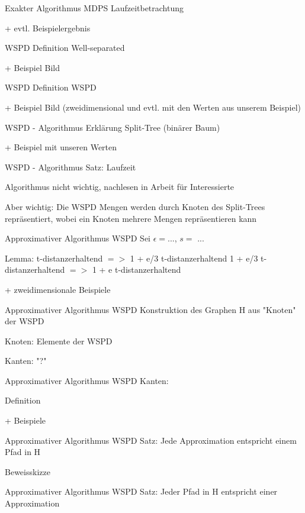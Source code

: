 \documentclass{beamer}
\begin{document}
	\begin{frame}{Exakter Algorithmus MDPS}
		Laufzeitbetrachtung
		
		+ evtl. Beispielergebnis
	\end{frame}
	
	\begin{frame}{WSPD}
		Definition Well-separated
		
		+ Beispiel Bild
	\end{frame}
	
	\begin{frame}{WSPD}
		Definition WSPD
		
		+ Beispiel Bild (zweidimensional und evtl. mit den Werten aus unserem Beispiel)
	\end{frame}
	
	\begin{frame}{WSPD - Algorithmus}
		Erklärung Split-Tree (binärer Baum)
		
		+ Beispiel mit unseren Werten
	\end{frame}
	
	
	\begin{frame}{WSPD - Algorithmus}
		Satz: Laufzeit
		
		Algorithmus nicht wichtig, nachlesen in Arbeit für Interessierte
		
		Aber wichtig: Die WSPD Mengen werden durch Knoten des Split-Trees repräsentiert, wobei ein Knoten mehrere Mengen repräsentieren kann
	\end{frame}
	
	\begin{frame}{Approximativer Algorithmus WSPD}
		Sei $\epsilon = $..., $s = $ ...
		
		Lemma: 	t-distanzerhaltend $=>$ 1 + e/3 t-distanzerhaltend
				1 + e/3 t-distanzerhaltend $=>$ 1 + e t-distanzerhaltend
				
		+ zweidimensionale Beispiele
	\end{frame}
	
	\begin{frame}{Approximativer Algorithmus WSPD}
		Konstruktion des Graphen H aus "Knoten" der WSPD
		
		Knoten: Elemente der WSPD
		
		Kanten: "?"
	\end{frame}
	
	\begin{frame}{Approximativer Algorithmus WSPD}
		Kanten:
		
		Definition
		
		+ Beispiele
	\end{frame}
	
	\begin{frame}{Approximativer Algorithmus WSPD}
		Satz: Jede Approximation entspricht einem Pfad in H
		
		Beweisskizze
	\end{frame}
	
	\begin{frame}{Approximativer Algorithmus WSPD}
		Satz: Jeder Pfad in H entspricht einer Approximation
	\end{frame}
\end{document}
